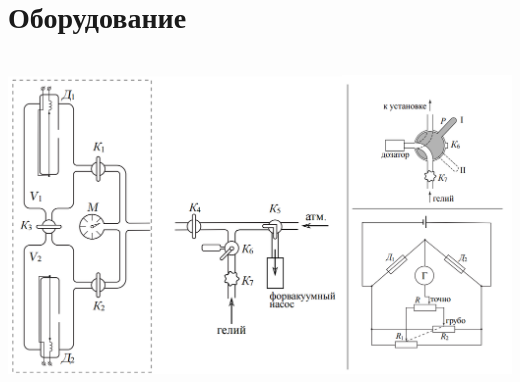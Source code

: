 \documentclass[11pt]{article}
\begin{document}
\section*{Оборудование}\
\includegraphics[scale=0.4]{pic1.png}
\end{document}
